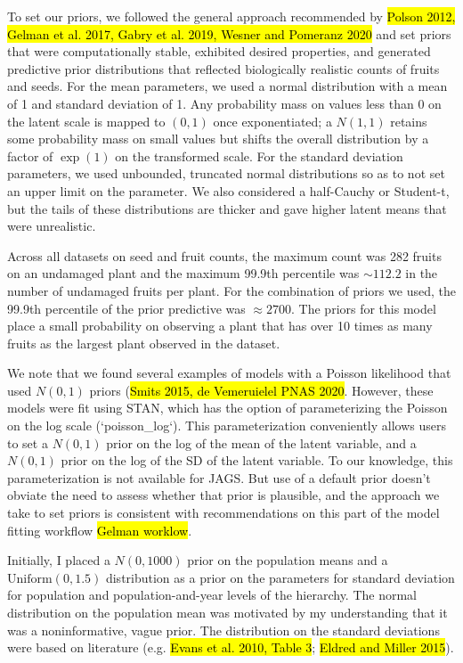 \documentclass[12pt, oneside, titlepage]{article}   	%
\begin{document}
To set our priors, we followed the general approach recommended by \hl{Polson 2012, Gelman et al. 2017, Gabry et al. 2019, Wesner and Pomeranz 2020} and set priors that were computationally stable, exhibited desired properties, and generated predictive prior distributions that reflected biologically realistic counts of fruits and seeds. For the mean parameters, we used a normal distribution with a mean of 1 and standard deviation of 1. Any probability mass on values less than 0 on the latent scale is mapped to $(0,1)$ once exponentiated; a $N(1,1)$ retains some probability mass on small values but shifts the overall distribution by a factor of $\exp(1)$ on the transformed scale. For the standard deviation parameters, we used unbounded, truncated normal distributions so as to not set an upper limit on the parameter. We also considered a half-Cauchy or Student-t, but the tails of these distributions are thicker and gave higher latent means that were unrealistic.

Across all datasets on seed and fruit counts, the maximum count was 282 fruits on an undamaged plant and the maximum 99.9th percentile was $\sim112.2$ in the number of undamaged fruits per plant. For the combination of priors we used, the 99.9th percentile of the prior predictive was $\approx 2700$. The priors for this model place a small probability on observing a plant that has over 10 times as many fruits as the largest plant observed in the dataset. 

We note that we found several examples of models with a Poisson likelihood that used $N(0,1)$ priors (\hl{Smits 2015, de Vemeruielel PNAS 2020}. However, these models were fit using STAN, which has the option of parameterizing the Poisson on the log scale (`poisson\_log`). This parameterization conveniently allows users to set a $N(0,1)$ prior on the log of the mean of the latent variable, and a $N(0,1)$ prior on the log of the SD of the latent variable. To our knowledge, this parameterization is not available for JAGS. But use of a default prior doesn't obviate the need to assess whether that prior is plausible, and the approach we take to set priors is consistent with recommendations on this part of the model fitting workflow \hl{Gelman worklow}.

Initially, I placed a $N(0,1000)$ prior on the population means and a $\mathrm{Uniform}(0,1.5)$ distribution as a prior on the parameters for standard deviation for population and population-and-year levels of the hierarchy. The normal distribution on the population mean was motivated by my understanding that it was a noninformative, vague prior. The distribution on the standard deviations were based on literature (e.g. \hl{Evans et al. 2010, Table 3}; \hl{Eldred and Miller 2015}). 
\end{document}
